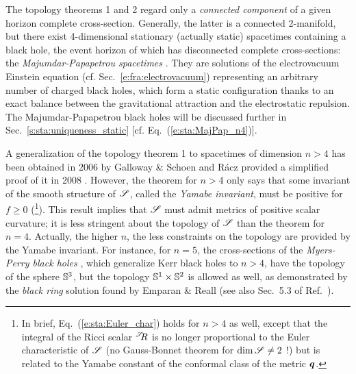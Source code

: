 \begin{remark}
\label{r:sta:Majumdar_Papapetrou}
The topology theorems 1 and 2 regard only
a \emph{connected component} of a given horizon complete cross-section.
Generally, the latter is a connected 2-manifold, but there exist
4-dimensional stationary (actually static) spacetimes containing a black hole,
the event horizon of which has
disconnected complete cross-sections: the
\emph{Majumdar-Papapetrou spacetimes}
\cite{Majum47,Papap47,HartlH72}. They are solutions of the
electrovacuum Einstein equation (cf. Sec.~\ref{e:fra:electrovacuum})
representing an arbitrary number of charged black holes,
which form a static configuration thanks to
an exact balance between the gravitational
attraction and the electrostatic repulsion. The Majumdar-Papapetrou black holes will be discussed
further in Sec.~\ref{s:sta:uniqueness_static} [cf. Eq.~(\ref{e:sta:MajPap_n4})].
\end{remark}

A generalization of the topology theorem 1 to spacetimes of
dimension $n>4$ has been obtained in 2006 by Galloway \& Schoen \cite{GalloS06}
and R\'acz provided a simplified
proof of it in 2008 \cite{Racz08}.
However, the theorem for $n>4$ only says that some invariant
of the smooth structure of $\mathscr{S}$, called the
\emph{Yamabe invariant}, must be positive for
$f \geq 0$ (\footnote{In brief, Eq.~(\ref{e:sta:Euler_char}) holds for $n>4$
as well, except that the integral of the Ricci scalar ${}^{\mathscr{S}}\!\!R$ is no longer
proportional to the Euler characteristic of $\mathscr{S}$ (no Gauss-Bonnet theorem for $\mathrm{dim}\, \mathscr{S} \neq 2$ !) but is related to the Yamabe constant of the conformal class of the metric $\bm{q}$.}). This result implies that $\mathscr{S}$ must admit metrics of positive scalar curvature; it is
less stringent about the topology of $\mathscr{S}$ than the theorem for $n=4$.
Actually, the higher $n$, the less constraints on
the topology are provided by the Yamabe invariant. For instance,
for $n=5$, the cross-sections of the \emph{Myers-Perry black holes} \cite{MyersP86,EmparR08,Reall14}, which generalize
Kerr black holes to $n>4$, have the
topology of the sphere $\mathbb{S}^3$, but the topology
$\mathbb{S}^1\times\mathbb{S}^2$ is allowed as well, as demonstrated
by the \emph{black ring} solution found by Emparan \& Reall \cite{EmparR02,EmparR08,Reall14} (see also Sec.~5.3 of Ref.~\cite{Chrus20}).


